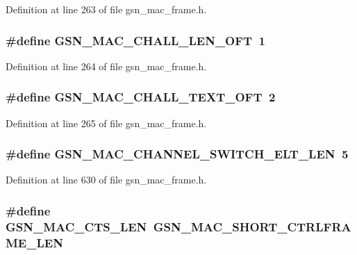 Definition at line 263 of file gsn\_\-mac\_\-frame.h.

\hypertarget{a00523_ad6ce1086b682d2f97b0429019bf4f291}{
\subsubsection[{GSN\_\-MAC\_\-CHALL\_\-LEN\_\-OFT}]{\setlength{\rightskip}{0pt plus 5cm}\#define GSN\_\-MAC\_\-CHALL\_\-LEN\_\-OFT~1}}
\label{a00523_ad6ce1086b682d2f97b0429019bf4f291}


Definition at line 264 of file gsn\_\-mac\_\-frame.h.

\hypertarget{a00523_a147de2cdb4bb82451b70648c0b2f5acd}{
\subsubsection[{GSN\_\-MAC\_\-CHALL\_\-TEXT\_\-OFT}]{\setlength{\rightskip}{0pt plus 5cm}\#define GSN\_\-MAC\_\-CHALL\_\-TEXT\_\-OFT~2}}
\label{a00523_a147de2cdb4bb82451b70648c0b2f5acd}


Definition at line 265 of file gsn\_\-mac\_\-frame.h.

\hypertarget{a00523_ae941035bac3504c53e82208f096da3f0}{
\subsubsection[{GSN\_\-MAC\_\-CHANNEL\_\-SWITCH\_\-ELT\_\-LEN}]{\setlength{\rightskip}{0pt plus 5cm}\#define GSN\_\-MAC\_\-CHANNEL\_\-SWITCH\_\-ELT\_\-LEN~5}}
\label{a00523_ae941035bac3504c53e82208f096da3f0}


Definition at line 630 of file gsn\_\-mac\_\-frame.h.

\hypertarget{a00523_a77bdfde16f3b56e7c5741330fd06aeb2}{
\subsubsection[{GSN\_\-MAC\_\-CTS\_\-LEN}]{\setlength{\rightskip}{0pt plus 5cm}\#define GSN\_\-MAC\_\-CTS\_\-LEN~GSN\_\-MAC\_\-SHORT\_\-CTRLFRAME\_\-LEN}}
\label{a00523_a77bdfde16f3b56e7c5741330fd06aeb2}



